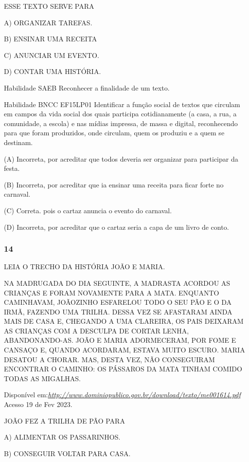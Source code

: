 \begin{escola}
\protect\hypertarget{_heading=h.2u6wntf}{}{}ESSE TEXTO SERVE PARA

A) ORGANIZAR TAREFAS.

B) ENSINAR UMA RECEITA

C) ANUNCIAR UM EVENTO.

D) CONTAR UMA HISTÓRIA.

Habilidade SAEB Reconhecer a finalidade de um texto.

Habilidade BNCC EF15LP01 Identificar a função social de textos que
circulam em campos da vida social dos quais participa cotidianamente (a
casa, a rua, a comunidade, a escola) e nas mídias impressa, de massa e
digital, reconhecendo para que foram produzidos, onde circulam, quem os
produziu e a quem se destinam.

(A) Incorreta, por acreditar que todos deveria ser organizar para
participar da festa.

(B) Incorreta, por acreditar que ia ensinar uma receita para ficar
forte no carnaval.

(C) Correta. pois o cartaz anuncia o evento do carnaval.

(D) Incorreta, por acreditar que o cartaz seria a capa de um livro de
conto.\protect\hypertarget{_heading=h.gluii2ldfhnb}{}{}

\subsubsection{14}\label{section-39}

LEIA O TRECHO DA HISTÓRIA JOÃO E MARIA.

NA MADRUGADA DO DIA SEGUINTE, A MADRASTA ACORDOU AS CRIANÇAS E FORAM
NOVAMENTE PARA A MATA. ENQUANTO CAMINHAVAM, JOÃOZINHO ESFARELOU TODO O
SEU PÃO E O DA IRMÃ, FAZENDO UMA TRILHA. DESSA VEZ SE AFASTARAM AINDA
MAIS DE CASA E, CHEGANDO A UMA CLAREIRA, OS PAIS DEIXARAM AS CRIANÇAS
COM A DESCULPA DE CORTAR LENHA, ABANDONANDO-AS. JOÃO E MARIA
ADORMECERAM, POR FOME E CANSAÇO E, QUANDO ACORDARAM, ESTAVA MUITO
ESCURO. MARIA DESATOU A CHORAR. MAS, DESTA VEZ, NÃO CONSEGUIRAM
ENCONTRAR O CAMINHO: OS PÁSSAROS DA MATA TINHAM COMIDO TODAS AS
MIGALHAS.

Disponível
em:\href{http://www.dominiopublico.gov.br/download/texto/me001614.pdf}{\emph{http://www.dominiopublico.gov.br/download/texto/me001614.pdf}}
Acesso 19 de Fev 2023.

JOÃO FEZ A TRILHA DE PÃO PARA

A) ALIMENTAR OS PASSARINHOS.

B) CONSEGUIR VOLTAR PARA CASA.


\end{escola}
